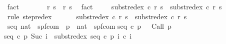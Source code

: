 \begin{isabellebody}
\ fact\isanewline
\ \ \isamarkupfalse%
\isanewline
\ \ \isamarkupfalse%
\ {\isachardoublequoteopen}{\isasymGamma}{\isasymturnstile}\ {\isacharparenleft}r{\isacharprime}{\isacharcomma}\ s{\isacharprime}{\isacharparenright}\ {\isasymrightarrow}\ {\isacharparenleft}r{\isacharprime}{\isacharprime}{\isacharcomma}\ s{\isacharprime}{\isacharprime}{\isacharparenright}{\isachardoublequoteclose}\ \isamarkupfalse%
\ fact\isanewline
\ \ \isamarkupfalse%
\ {\isachardoublequoteopen}{\isasymGamma}{\isasymturnstile}\ {\isacharparenleft}subst{\isacharunderscore}redex\ c\ r{\isacharprime}{\isacharcomma}\ s{\isacharprime}{\isacharparenright}\ {\isasymrightarrow}\ {\isacharparenleft}subst{\isacharunderscore}redex\ c\ r{\isacharprime}{\isacharprime}{\isacharcomma}\ s{\isacharprime}{\isacharprime}{\isacharparenright}{\isachardoublequoteclose}\isanewline
\ \ \ \ \isamarkupfalse%
\ {\isacharparenleft}rule\ step{\isacharunderscore}redex{\isacharparenright}\isanewline
\ \ \isamarkupfalse%
\ \isamarkupfalse%
\ {\isachardoublequoteopen}{\isasymGamma}{\isasymturnstile}\ {\isacharparenleft}subst{\isacharunderscore}redex\ c\ r{\isacharcomma}\ s{\isacharparenright}\ {\isasymrightarrow}\isactrlsup {\isacharplus}\ {\isacharparenleft}subst{\isacharunderscore}redex\ c\ r{\isacharprime}{\isacharprime}{\isacharcomma}\ s{\isacharprime}{\isacharprime}{\isacharparenright}{\isachardoublequoteclose}\ \isacommand{{\isachardot}}\isamarkupfalse%
\isanewline
{}\isamarkupfalse%
%
\endisatagproof
{\isafoldproof}%
%
\isadelimproof
\isanewline
%
\endisadelimproof
\isanewline
{}\isamarkupfalse%
\ seq{\isacharcolon}{\isacharcolon}\ {\isachardoublequoteopen}{\isacharparenleft}nat\ {\isasymRightarrow}\ {\isacharparenleft}{\isacharprime}s{\isacharcomma}{\isacharprime}p{\isacharcomma}{\isacharprime}f{\isacharparenright}com{\isacharparenright}\ {\isasymRightarrow}\ {\isacharprime}p\ {\isasymRightarrow}\ nat\ {\isasymRightarrow}\ {\isacharparenleft}{\isacharprime}s{\isacharcomma}{\isacharprime}p{\isacharcomma}{\isacharprime}f{\isacharparenright}com{\isachardoublequoteclose}\isanewline
{}\isanewline
{\isachardoublequoteopen}seq\ c\ p\ {}\ {\isacharequal}\ Call\ p{\isachardoublequoteclose}\ {\isacharbar}\isanewline
{\isachardoublequoteopen}seq\ c\ p\ {\isacharparenleft}Suc\ i{\isacharparenright}\ {\isacharequal}\ subst{\isacharunderscore}redex\ {\isacharparenleft}seq\ c\ p\ i{\isacharparenright}\ {\isacharparenleft}c\ i{\isacharparenright}{\isachardoublequoteclose}\isanewline

\end{isabellebody}
